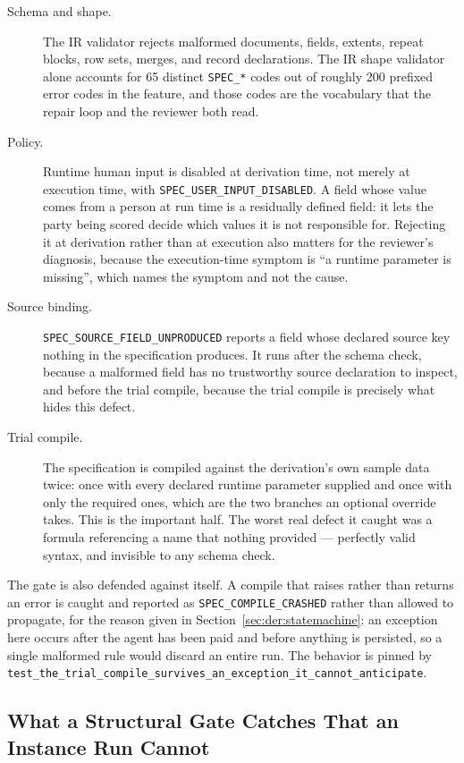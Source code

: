 \begin{description}
  \item[Schema and shape.] The IR validator rejects malformed documents, fields, extents,
    repeat blocks, row sets, merges, and record declarations. The IR shape validator alone
    accounts for 65 distinct \texttt{SPEC\_*} codes out of roughly 200 prefixed error codes in
    the feature, and those codes are the vocabulary that the repair loop and the reviewer both
    read.
  \item[Policy.] Runtime human input is disabled at derivation time, not merely at execution
    time, with \texttt{SPEC\_USER\_INPUT\_DISABLED}. A field whose value comes from a person
    at run time is a residually defined field: it lets the party being scored decide which
    values it is not responsible for. Rejecting it at derivation rather than at execution also
    matters for the reviewer's diagnosis, because the execution-time symptom is ``a runtime
    parameter is missing'', which names the symptom and not the cause.
  \item[Source binding.] \texttt{SPEC\_SOURCE\_FIELD\_UNPRODUCED} reports a field whose declared
    source key nothing in the specification produces. It runs after the schema check, because a
    malformed field has no trustworthy source declaration to inspect, and before the trial
    compile, because the trial compile is precisely what hides this defect.
  \item[Trial compile.] The specification is compiled against the derivation's own sample data
    twice: once with every declared runtime parameter supplied and once with only the required
    ones, which are the two branches an optional override takes. This is the important half.
    The worst real defect it caught was a formula referencing a name that nothing provided ---
    perfectly valid syntax, and invisible to any schema check.
\end{description}

The gate is also defended against itself. A compile that raises rather than returns an error is
caught and reported as \texttt{SPEC\_COMPILE\_CRASHED} rather than allowed to propagate, for the
reason given in Section~\ref{sec:der:statemachine}: an exception here occurs after the agent has
been paid and before anything is persisted, so a single malformed rule would discard an entire
run. The behavior is pinned by
\texttt{test\_the\_trial\_compile\_survives\_an\_exception\_it\_cannot\_anticipate}.

\subsection{What a Structural Gate Catches That an Instance Run Cannot}
\label{sec:der:gates:value}

